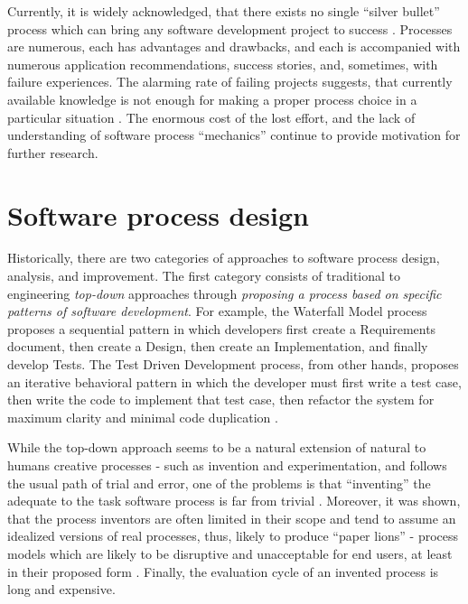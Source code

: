 
Currently, it is widely acknowledged, that there exists no single ``silver bullet'' process which can bring any 
software development project to success \cite{citeulike:1986013}. Processes are numerous, each has advantages 
and drawbacks, and each is accompanied with numerous application recommendations, success stories, and, 
sometimes, with failure experiences. 
The alarming rate of failing projects suggests, that currently available knowledge is not enough for
making a proper process choice in a particular situation \cite{citeulike:12550665}. 
The enormous cost of the lost effort, and the lack of understanding of software process ``mechanics'' 
continue to provide motivation for further research. 

\section{Software process design}\label{section_software_process}
Historically, there are two categories of approaches to software process design, analysis, and improvement. 
The first category consists of traditional to engineering \textit{top-down} approaches through \textit{proposing a
process based on specific patterns of software development}. 
For example, the Waterfall Model process proposes a sequential pattern in which developers first create a 
Requirements document, then create a Design, then create an Implementation, and finally develop Tests. 
The Test Driven Development process, from other hands, proposes an iterative behavioral pattern in which
the developer must first write a test case, then write the code to implement that test case, then refactor the 
system for maximum clarity and minimal code duplication \cite{citeulike:6086365}. 

While the top-down approach seems to be a natural extension of natural to humans creative processes - 
such as invention
and experimentation, and follows the usual path of trial and error, one of the problems is that ``inventing''
the adequate 
to the task software process is far from trivial \cite{citeulike:5043104} \cite{citeulike:1986013}. 
Moreover, it was shown, that the process inventors are often limited in their scope and tend to assume an idealized
versions of real processes, thus, likely to produce ``paper lions'' - process models which are likely to be
disruptive and unacceptable for end users, at least in their proposed form \cite{citeulike:9758924}. 
Finally, the evaluation cycle of an invented process is long and expensive. 

